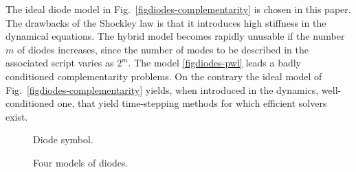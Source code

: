  The ideal diode model in Fig.~\ref{figdiodes-complementarity} is chosen in this paper. The drawbacks of the Shockley law is that it introduces high stiffness in the dynamical equations. The hybrid model becomes rapidly unusable if the number $m$ of diodes increases, since the number of modes to be described in the associated script varies as $2^{m}$. The model \ref{figdiodes-pwl} leads a badly conditioned complementarity problems. On the contrary the ideal model of Fig.~\ref{figdiodes-complementarity} yields, when introduced in the dynamics, well-conditioned one, that yield time-stepping methods for which efficient solvers exist.
\begin{figure}
  \centering
  
  \caption{Diode symbol.}
  \label{fig:DIODE}
\end{figure}

\begin{figure*}[!ht]
  \hspace{-2mm}
   \hspace{-2mm}
      \caption{Four models of diodes.}
\label{figdiodes}
\end{figure*}
